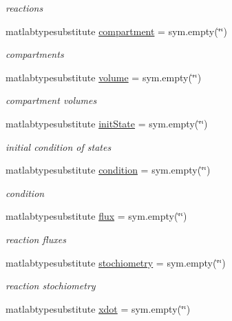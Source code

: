 \begin{DoxyCompactItemize}
\begin{DoxyCompactList}\small\item\em reactions \end{DoxyCompactList}\item 
matlabtypesubstitute \hyperlink{class_s_b_m_lode_a70729d905c114f8f08b3507f20806dd2}{compartment} = sym.\+empty(\char`\"{}\char`\"{})
\begin{DoxyCompactList}\small\item\em compartments \end{DoxyCompactList}\item 
matlabtypesubstitute \hyperlink{class_s_b_m_lode_a9bc498ccac8db41438f855f5dd3f4c05}{volume} = sym.\+empty(\char`\"{}\char`\"{})
\begin{DoxyCompactList}\small\item\em compartment volumes \end{DoxyCompactList}\item 
matlabtypesubstitute \hyperlink{class_s_b_m_lode_a67d068407e71cba6ca16f3f6b6d1794c}{init\+State} = sym.\+empty(\char`\"{}\char`\"{})
\begin{DoxyCompactList}\small\item\em initial condition of states \end{DoxyCompactList}\item 
matlabtypesubstitute \hyperlink{class_s_b_m_lode_a4824b91cc0e6b5f112bdd8049af4d7d6}{condition} = sym.\+empty(\char`\"{}\char`\"{})
\begin{DoxyCompactList}\small\item\em condition \end{DoxyCompactList}\item 
matlabtypesubstitute \hyperlink{class_s_b_m_lode_a96d7a28b6a4428be15fc1017d19343fa}{flux} = sym.\+empty(\char`\"{}\char`\"{})
\begin{DoxyCompactList}\small\item\em reaction fluxes \end{DoxyCompactList}\item 
matlabtypesubstitute \hyperlink{class_s_b_m_lode_a8d6dd1568c43b32f1810a5fe9ef6100f}{stochiometry} = sym.\+empty(\char`\"{}\char`\"{})
\begin{DoxyCompactList}\small\item\em reaction stochiometry \end{DoxyCompactList}\item 
matlabtypesubstitute \hyperlink{class_s_b_m_lode_a914ee05b8f01d45602316710ca4b8a43}{xdot} = sym.\+empty(\char`\"{}\char`\"{})

\end{DoxyCompactItemize}
